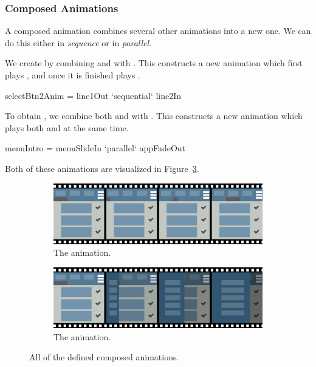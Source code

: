 \subsubsection{Composed Animations}

A composed animation combines several other animations into a new one. We can do this either in \emph{sequence} or in \emph{parallel}.

We create  by combining  and  with . This constructs a new animation which first plays , and once it is finished plays .

\begin{spec}
selectBtn2Anim = line1Out `sequential` line2In
\end{spec}

To obtain , we combine both  and  with . This constructs a new animation which plays both  and  at the same time.

\begin{spec}
menuIntro = menuSlideIn `parallel` appFadeOut
\end{spec}

Both of these animations are visualized in Figure~\ref{fig:composed}.

\begin{figure}[!htbp]
\centering

\begin{subfigure}[h]{\textwidth}
\centering
\includegraphics[width=\figscale\textwidth]{pictures/selectBtn2AnimFig}
\caption{The  animation.}
\label{fig:composed1}
\end{subfigure}

\begin{subfigure}[h]{\textwidth}
\centering
\includegraphics[width=\figscale\textwidth]{pictures/menuIntroFig}
\caption{The  animation.}
\label{fig:composed2}
\end{subfigure}

\caption{All of the defined composed animations.}
\label{fig:composed}
\end{figure}
